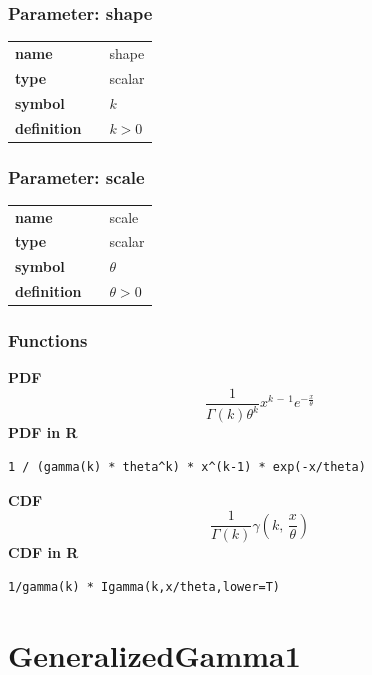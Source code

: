 \subsubsection*{Parameter: shape}

\noindent\begin{tabular}{p{2cm}cl}
\textbf{name} & & shape \\
\textbf{type} & & scalar \\
\textbf{symbol} & & $k$  \\
\textbf{definition} & & $k > 0$
\end{tabular}

\subsubsection*{Parameter: scale}

\noindent\begin{tabular}{p{2cm}cl}
\textbf{name} & & scale \\
\textbf{type} & & scalar \\
\textbf{symbol} & & $\theta$  \\
\textbf{definition} & & $\theta > 0$
\end{tabular}
\subsubsection*{Functions}

\smallskip \noindent \hspace{.2cm} \textbf{PDF} 
\begin{equation*}\frac{1}{\Gamma(k) \theta^k} x^{k \,-\, 1} e^{-\frac{x}{\theta}}\end{equation*}
\smallskip \noindent \hspace{.2cm} \textbf{PDF in R}  
\begin{verbatim}1 / (gamma(k) * theta^k) * x^(k-1) * exp(-x/theta)\end{verbatim}
\smallskip \noindent \hspace{.2cm} \textbf{CDF} 
\begin{equation*}\frac{1}{\Gamma(k)} \gamma\left(k,\, \frac{x}{\theta}\right)\end{equation*}
\smallskip \noindent \hspace{.2cm} \textbf{CDF in R}  
\begin{verbatim}1/gamma(k) * Igamma(k,x/theta,lower=T)\end{verbatim}
\smallskip\section*{GeneralizedGamma1} 

